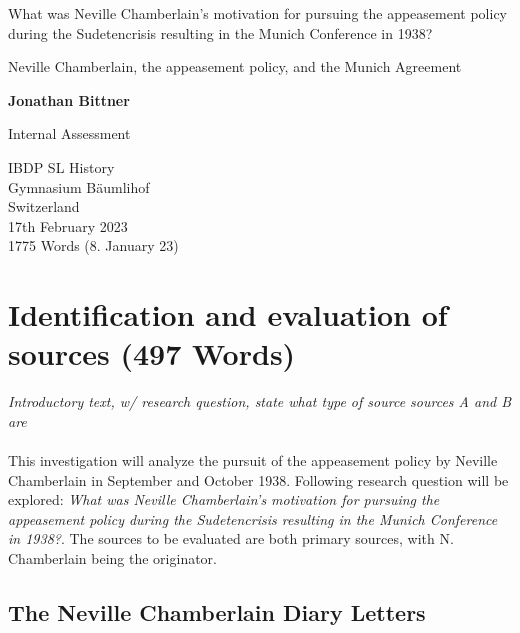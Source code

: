 \documentclass[10pt, a4papert, hidelinks]{article}
\begin{document}
\begin{titlepage}
	\begin{center}
		\vspace*{1cm}
 
		What was Neville Chamberlain's motivation for pursuing the appeasement policy during the Sudetencrisis resulting in the Munich Conference in 1938?
 
		\vspace{0.5cm}
		Neville Chamberlain, the appeasement policy, and the Munich Agreement
			 
		\vspace{1.5cm}
 
		\textbf{Jonathan Bittner}
 
		\vfill
			 
		Internal Assessment
			 
		\vspace{0.8cm}
	  
			 
		IBDP SL History\\
		Gymnasium Bäumlihof\\
		Switzerland\\
		17th February 2023\\
		1775 Words (8. January 23)
			 
	\end{center}
 \end{titlepage}

\tableofcontents
\newpage

\section{Identification and evaluation of sources (497 Words)} %


\emph{Introductory text, w/ research question, state what type of source sources A and B are}\\\\
This investigation will analyze the pursuit of the appeasement policy by Neville Chamberlain in September and October 1938. Following research question will be explored: \emph{What was Neville Chamberlain's motivation for pursuing the appeasement policy during the Sudetencrisis resulting in the Munich Conference in 1938?}. The sources to be evaluated are both primary sources, with N. Chamberlain being the originator.

\subsection{The Neville Chamberlain Diary Letters} %
\end{document}
